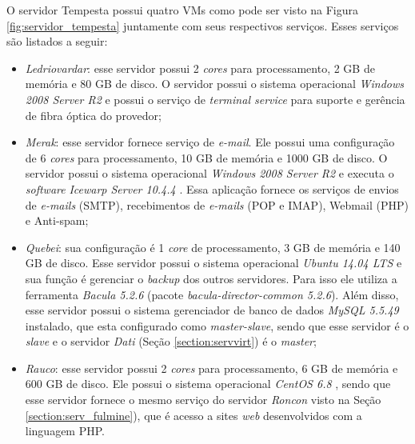 O servidor Tempesta possui quatro \ac{VM}s como pode ser visto na Figura \ref{fig:servidor_tempesta} juntamente com seus respectivos serviços. 
Esses serviços são listados a seguir:
\begin{itemize}
 \item \textit{Ledriovardar}: esse servidor possui 2 \textit{cores} para processamento, 2 GB de memória e 80 GB de disco. O servidor possui 
 o sistema operacional \textit{Windows 2008 Server R2} e possui o serviço de \textit{terminal service} para suporte e gerência de fibra 
 óptica do provedor;
 
 \item \textit{Merak}: esse servidor fornece serviço de \textit{e-mail}. Ele possui uma configuração de 6 \textit{cores} para processamento, 
 10 GB de memória e 1000 GB de disco. O servidor possui o sistema operacional \textit{Windows 2008 Server R2} e executa o \textit{software} 
 \textit{Icewarp Server 10.4.4} \cite{icewarp}. Essa aplicação fornece os serviços de envios de \textit{e-mails} (\ac{SMTP}), recebimentos 
 de \textit{e-mails} (\ac{POP} e \ac{IMAP}), Webmail (\ac{PHP}) e Anti-spam;

 \item \textit{Quebei}: sua configuração é 1 \textit{core} de processamento, 3 GB de memória e 140 GB de disco. Esse servidor possui o 
 sistema operacional \textit{Ubuntu 14.04 \ac{LTS}} \cite{ubuntu} e sua função é gerenciar o \textit{backup} dos outros servidores. Para isso 
 ele utiliza a ferramenta \textit{Bacula 5.2.6} \cite{bacula} (pacote \textit{bacula-director-common 5.2.6}). Além disso, esse servidor possui 
 o sistema gerenciador de banco de dados \textit{MySQL 5.5.49} \cite{mysql} instalado, que esta configurado como \textit{master-slave}, sendo 
 que esse servidor é o \textit{slave} e o servidor \textit{Dati} (Seção \ref{section:servvirt}) é o \textit{master};
 
 \item \textit{Rauco}: esse servidor possui 2 \textit{cores} para processamento, 6 GB de memória e 600 GB de disco. Ele possui o sistema 
 operacional \textit{CentOS 6.8} \cite{centos}, sendo que esse servidor fornece o mesmo serviço do servidor \textit{Roncon} visto na 
 Seção \ref{section:serv_fulmine}), que é acesso a sites \textit{web} desenvolvidos com a linguagem \ac{PHP}.
\end{itemize}


